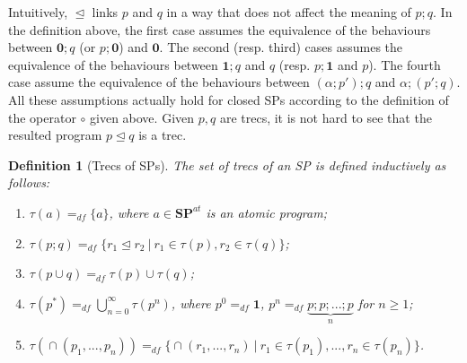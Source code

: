 \documentclass{fcs}
\newtheorem{mydef}{Definition}[section]
\newcommand{\noth}[0]{\mathbf{1}}
\newcommand{\halt}[0]{\mathbf{0}}
\newcommand{\SP}[0]{\mathbf{SP}}
\DeclareMathOperator{\seq}{;}
\DeclareMathOperator{\cho}{\cup}
\DeclareMathOperator{\para}{\cap}
\newcommand{\ASP}[0]{\SP^{\mathit{at}}}
\DeclareMathOperator{\link}{\unlhd}
\newcommand{\dddef}[0]{=_{df}}
\begin{document}
Intuitively, $\link$ links $p$ and $q$ in a way that does not affect the meaning of $p\seq q$.
In the definition above, the first case assumes the equivalence of the behaviours between $\halt\seq q$ (or $p\seq \halt$) and $\halt$.
The second (resp. third) cases assumes the equivalence of the behaviours between $\noth\seq q$ and $q$ (resp. $p\seq \noth$ and $p$).
The fourth case assume the equivalence of the behaviours between $(\alpha \seq p')\seq q$ and $\alpha\seq (p'\seq q)$.
All these assumptions actually hold for closed SPs according to the definition of the operator $\circ$ given above.
Given $p, q$ are trecs, it is not hard to see that the resulted program $p\link q$ is a trec.

\begin{mydef}[Trecs of SPs]
	\label{def:Trecs of SPs}
	The set of trecs of an SP is defined inductively as follows:
	\begin{enumerate}
		\item $\tau(a) \dddef \{a\}$, where $a\in \ASP$ is an atomic program;
		\item $\tau(p\seq q)\dddef \{r_1\link r_2\ |\ r_1\in \tau(p), r_2\in \tau(q)\}$;
		\item $\tau(p\cho q)\dddef \tau(p)\cup \tau(q)$;
		\item $\tau(p^*)\dddef \bigcup^\infty_{n=0} \tau(p^n)$, where $p^0\dddef \noth$, $p^n\dddef \underbrace{p\seq p\seq ...\seq p}_{n}$ for $n\ge 1$;
		
		
		\item $\tau(\para(p_1,...,p_n))\dddef \{\para(r_1,...,r_n)\ |\ r_1\in \tau(p_1),..., r_n\in \tau(p_n)\}$.
	\end{enumerate}
\end{mydef}
\end{document}
